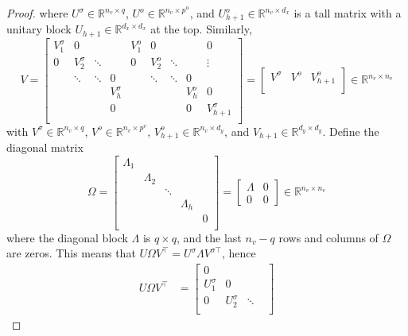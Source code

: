 \documentclass[10pt,a4paper]{amsart}
\begin{document}
\begin{proof}
where $U^\sigma\in\mathbb{R}^{n_v\times q}$, $U^o\in\mathbb{R}^{n_v\times p^u}$, and $U_{h+1}^o\in\mathbb{R}^{n_v\times d_x}$ is a tall matrix with a unitary block $U_{h+1}\in\mathbb{R}^{d_x\times d_x}$ at the top. Similarly,
\begin{equation}
	V = 
	\left[
	\begin{array}{cccc|cccc|c}
		V_1^{\sigma} & 0 & & & V_{1}^o & 0 & & & 0 \\
		0 & V_2^{\sigma} & \ddots & & 0 & V_{2}^o & \ddots & & \vdots\\
		& \ddots & \ddots & 0 & & \ddots & \ddots & 0 & \\
		& & & V_{h}^{\sigma} & & & & V_{h}^{o} & 0 \\
		& & & 0 & & & & 0 & V_{h+1}^{\sigma} \\
	\end{array}
	\right] = \left[
	\begin{array}{c|c|c}
		V^\sigma & V^o & V_{h+1}^o \\
	\end{array}
	\right] \in\mathbb{R}^{n_v\times n_v}
    \label{eq:svd_V}
\end{equation}
with  $V^\sigma\in\mathbb{R}^{n_v\times q}$, $V^o\in\mathbb{R}^{n_v\times p^v}$, $V_{h+1}^o\in\mathbb{R}^{n_v\times d_y}$, and $V_{h+1}\in\mathbb{R}^{d_y\times d_y}$. Define the diagonal matrix
\begin{equation}\label{eq:svddiag}
	\Omega = \begin{bmatrix}
		\Lambda_1 & & & & \\
		& \Lambda_2 & & & \\
		& & \ddots & & \\
		& & & \Lambda_h & \\
		& & & & 0 \\
	\end{bmatrix} = \begin{bmatrix}
	\Lambda & 0 \\
	0 & 0
	\end{bmatrix} \in\mathbb{R}^{n_v\times n_v}
\end{equation}
where the diagonal block $\Lambda$ is $q\times q$, and the last $n_v-q$ rows and columns of $\Omega$ are zeros. This means that $U\Omega V^\top  = U^\sigma \Lambda V^{\sigma \top}$, hence
\begin{align}
	U\Omega V^\top  & = \begin{bmatrix}
		0 & & & \\
		U_1^\sigma & 0 & & \\
		0 & U_2^\sigma & \ddots & \\

\end{bmatrix}
\end{align}
\end{proof}
\end{document}

